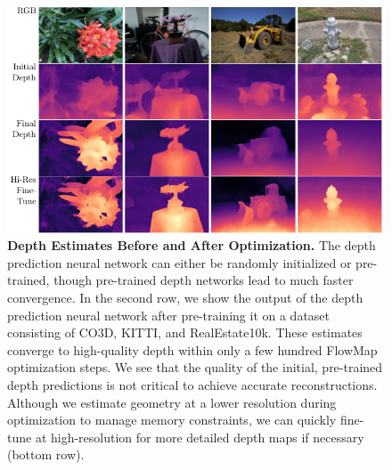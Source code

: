 \begin{figure}[t!]
    \centering
    \includegraphics[width=\linewidth,]{figures/depth_vis_hires_compressed.pdf}
    \caption{\textbf{Depth Estimates Before and After Optimization.} The depth prediction neural network can either be randomly initialized or pre-trained, though pre-trained depth networks lead to much faster convergence. 
    In the second row, we show the output of the depth prediction neural network after pre-training it on a dataset consisting of CO3D, KITTI, and RealEstate10k. 
    These estimates converge to high-quality depth within only a few hundred FlowMap optimization steps. We see that the quality of the initial, pre-trained depth predictions is not critical to achieve accurate reconstructions.
    Although we estimate geometry at a lower resolution during optimization to manage memory constraints, we can quickly fine-tune at high-resolution for more detailed depth maps if necessary (bottom row). 
    }
    \label{fig:depths}
\end{figure}
